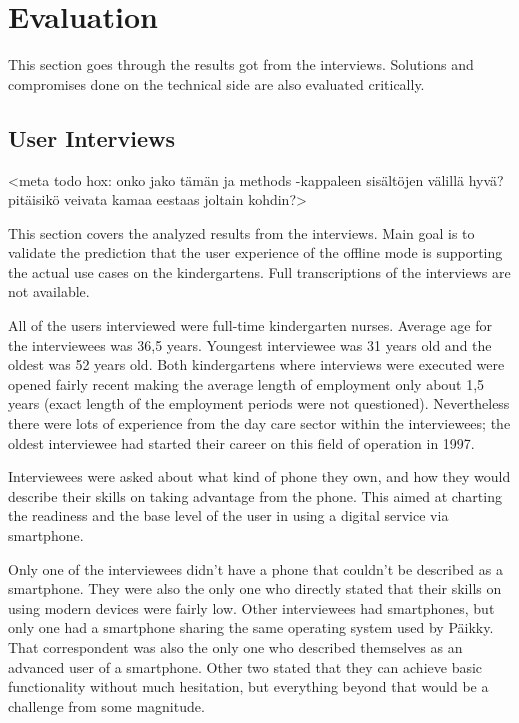 \chapter{Evaluation}

This section goes through the results got from the interviews. Solutions and compromises done on the technical side are also evaluated critically.


\section{User Interviews}

<meta todo hox: onko jako tämän ja methods -kappaleen sisältöjen välillä hyvä? pitäisikö veivata kamaa eestaas joltain kohdin?>

This section covers the analyzed results from the interviews. Main goal is to validate the prediction that the user experience of the offline mode is supporting the actual use cases on the kindergartens. Full transcriptions of the interviews are not available.

All of the users interviewed were full-time kindergarten nurses. Average age for the interviewees was 36,5 years. Youngest interviewee was 31 years old and the oldest was 52 years old. Both kindergartens where interviews were executed were opened fairly recent making the average length of employment only about 1,5 years (exact length of the employment periods were not questioned). Nevertheless there were lots of experience from the day care sector within the interviewees; the oldest interviewee had started their career on this field of operation in 1997.

Interviewees were asked about what kind of phone they own, and how they would describe their skills on taking advantage from the phone. This aimed at charting the readiness and the base level of the user in using a digital service via smartphone. 

Only one of the interviewees didn't have a phone that couldn't be described as a smartphone. They were also the only one who directly stated that their skills on using modern devices were fairly low. Other interviewees had smartphones, but only one had a smartphone sharing the same operating system used by Päikky. That correspondent was also the only one who described themselves as an advanced user of a smartphone. Other two stated that they can achieve basic functionality without much hesitation, but everything beyond that would be a challenge from some magnitude. 

